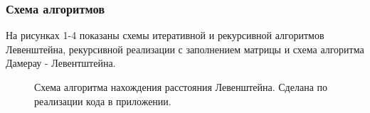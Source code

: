 \documentclass[a4paper]{article}
\begin{document}
	\subsubsection{Схема алгоритмов}
	На рисунках 1-4 показаны схемы  итеративной и рекурсивной алгоритмов Левенштейна, рекурсивной реализации с заполнением матрицы и схема алгоритма Дамерау - Левентштейна.
	\begin{figure}[h]
		\caption{Схема алгоритма нахождения расстояния Левенштейна. Сделана по реализации кода в приложении.\centering}
		\label{image1}
	\end{figure}
\end{document}
